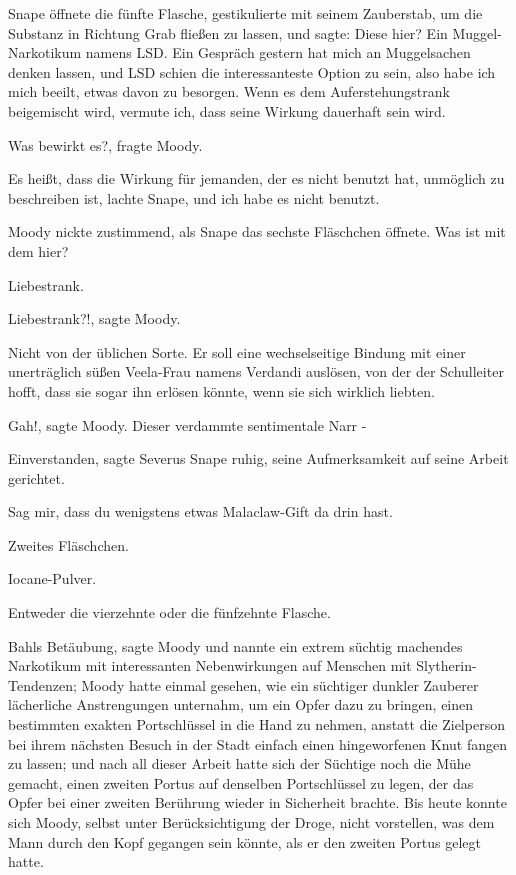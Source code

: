 Snape öffnete die fünfte Flasche, gestikulierte mit seinem Zauberstab, um die
Substanz in Richtung Grab fließen zu lassen, und sagte: \glqq Diese hier? Ein
Muggel-Narkotikum namens LSD. Ein Gespräch gestern hat mich an Muggelsachen
denken lassen, und LSD schien die interessanteste Option zu sein, also habe ich
mich beeilt, etwas davon zu besorgen. Wenn es dem Auferstehungstrank beigemischt
wird, vermute ich, dass seine Wirkung dauerhaft sein wird.\grqq{}

\glqq Was bewirkt es?\grqq{}, fragte Moody.

\glqq Es heißt, dass die Wirkung für jemanden, der es nicht benutzt hat,
unmöglich zu beschreiben ist\grqq{}, lachte Snape, \glqq und ich habe es nicht
benutzt.\grqq{}

Moody nickte zustimmend, als Snape das sechste Fläschchen öffnete. \glqq Was ist
mit dem hier?\grqq{}

\glqq Liebestrank.\grqq{}

\glqq Liebestrank?!\grqq{}, sagte Moody.

\glqq Nicht von der üblichen Sorte. Er soll eine wechselseitige Bindung mit
einer unerträglich süßen Veela-Frau namens Verdandi auslösen, von der der
Schulleiter hofft, dass sie sogar ihn erlösen könnte, wenn sie sich wirklich
liebten.\grqq{}

\glqq Gah!\grqq{}, sagte Moody. \glqq Dieser verdammte sentimentale Narr
-\grqq{}

\glqq Einverstanden\grqq{}, sagte Severus Snape ruhig, seine Aufmerksamkeit auf
seine Arbeit gerichtet.

\glqq Sag mir, dass du wenigstens etwas Malaclaw-Gift da drin hast.\grqq{}

\glqq Zweites Fläschchen.\grqq{}

\glqq Iocane-Pulver.\grqq{}

\glqq Entweder die vierzehnte oder die fünfzehnte Flasche.\grqq{}

\glqq Bahls Betäubung\grqq{}, sagte Moody und nannte ein extrem süchtig
machendes Narkotikum mit interessanten Nebenwirkungen auf Menschen mit
Slytherin-Tendenzen; Moody hatte einmal gesehen, wie ein süchtiger dunkler
Zauberer lächerliche Anstrengungen unternahm, um ein Opfer dazu zu bringen,
einen bestimmten exakten Portschlüssel in die Hand zu nehmen, anstatt die
Zielperson bei ihrem nächsten Besuch in der Stadt einfach einen hingeworfenen
Knut fangen zu lassen; und nach all dieser Arbeit hatte sich der Süchtige noch
die Mühe gemacht, einen zweiten Portus auf denselben Portschlüssel zu legen, der
das Opfer bei einer zweiten Berührung wieder in Sicherheit brachte. Bis heute
konnte sich Moody, selbst unter Berücksichtigung der Droge, nicht vorstellen,
was dem Mann durch den Kopf gegangen sein könnte, als er den zweiten Portus
gelegt hatte.

